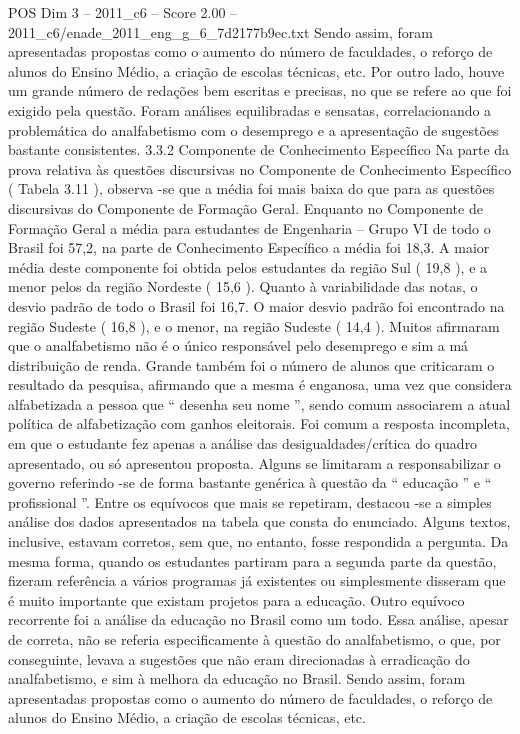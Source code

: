 \begin{textsample}{POS Dim 3 – 2011\_c6 – Score 2.00 – 2011\_c6/enade\_2011\_eng\_g\_6\_7d2177b9ec.txt}
Sendo assim, foram apresentadas propostas como o aumento do número de faculdades, o reforço de alunos do Ensino Médio, a criação de escolas técnicas, etc.
Por outro lado, houve um grande número de redações bem escritas e precisas, no que se refere ao que foi exigido pela questão.
Foram análises equilibradas e sensatas, correlacionando a problemática do analfabetismo com o desemprego e a apresentação de sugestões bastante consistentes. 3.3.2 Componente de Conhecimento Específico Na parte da prova relativa às questões discursivas no Componente de Conhecimento Específico ( Tabela 3.11 ), observa -se que a média foi mais baixa do que para as questões discursivas do Componente de Formação Geral.
Enquanto no Componente de Formação Geral a média para estudantes de Engenharia – Grupo VI de todo o Brasil foi 57,2, na parte de Conhecimento Específico a média foi 18,3.
A maior média deste componente foi obtida pelos estudantes da região Sul ( 19,8 ), e a menor pelos da região Nordeste ( 15,6 ).
Quanto à variabilidade das notas, o desvio padrão de todo o Brasil foi 16,7.
O maior desvio padrão foi encontrado na região Sudeste ( 16,8 ), e o menor, na região Sudeste ( 14,4 ).
Muitos afirmaram que o analfabetismo não é o único responsável pelo desemprego e sim a má distribuição de renda.
Grande também foi o número de alunos que criticaram o resultado da pesquisa, afirmando que a mesma é enganosa, uma vez que considera alfabetizada a pessoa que “ desenha seu nome ”, sendo comum associarem a atual política de alfabetização com ganhos eleitorais.
Foi comum a resposta incompleta, em que o estudante fez apenas a análise das desigualdades/crítica do quadro apresentado, ou só apresentou proposta.
Alguns se limitaram a responsabilizar o governo referindo -se de forma bastante genérica à questão da “ educação ” e “ profissional ”.
Entre os equívocos que mais se repetiram, destacou -se a simples análise dos dados apresentados na tabela que consta do enunciado.
Alguns textos, inclusive, estavam corretos, sem que, no entanto, fosse respondida a pergunta.
Da mesma forma, quando os estudantes partiram para a segunda parte da questão, fizeram referência a vários programas já existentes ou simplesmente disseram que é muito importante que existam projetos para a educação.
Outro equívoco recorrente foi a análise da educação no Brasil como um todo.
Essa análise, apesar de correta, não se referia especificamente à questão do analfabetismo, o que, por conseguinte, levava a sugestões que não eram direcionadas à erradicação do analfabetismo, e sim à melhora da educação no Brasil.
Sendo assim, foram apresentadas propostas como o aumento do número de faculdades, o reforço de alunos do Ensino Médio, a criação de escolas técnicas, etc.

\end{textsample}
